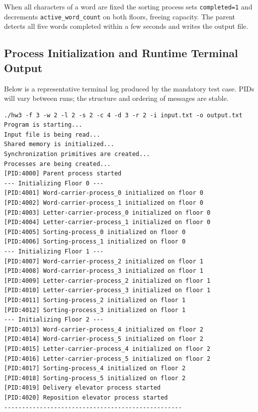 \documentclass[12pt,a4paper]{article}
\newcommand{\code}[1]{\texttt{\small #1}}
\begin{document}
When all characters of a word are fixed the sorting process sets
\code{completed=1} and decrements \code{active\_word\_count} on both floors,
freeing capacity. The parent detects all five words completed within a few seconds
and writes the output file.

\subsection{Process Initialization and Runtime Terminal Output}

Below is a representative terminal log produced by the mandatory test case.
PIDs will vary between runs; the structure and ordering of messages are stable.

\begin{lstlisting}[language={},numbers=none,caption={Program startup and process initialization (mandatory test case).}]
./hw3 -f 3 -w 2 -l 2 -s 2 -c 4 -d 3 -r 2 -i input.txt -o output.txt
Program is starting...
Input file is being read...
Shared memory is initialized...
Synchronization primitives are created...
Processes are being created...
[PID:4000] Parent process started
--- Initializing Floor 0 ---
[PID:4001] Word-carrier-process_0 initialized on floor 0
[PID:4002] Word-carrier-process_1 initialized on floor 0
[PID:4003] Letter-carrier-process_0 initialized on floor 0
[PID:4004] Letter-carrier-process_1 initialized on floor 0
[PID:4005] Sorting-process_0 initialized on floor 0
[PID:4006] Sorting-process_1 initialized on floor 0
--- Initializing Floor 1 ---
[PID:4007] Word-carrier-process_2 initialized on floor 1
[PID:4008] Word-carrier-process_3 initialized on floor 1
[PID:4009] Letter-carrier-process_2 initialized on floor 1
[PID:4010] Letter-carrier-process_3 initialized on floor 1
[PID:4011] Sorting-process_2 initialized on floor 1
[PID:4012] Sorting-process_3 initialized on floor 1
--- Initializing Floor 2 ---
[PID:4013] Word-carrier-process_4 initialized on floor 2
[PID:4014] Word-carrier-process_5 initialized on floor 2
[PID:4015] Letter-carrier-process_4 initialized on floor 2
[PID:4016] Letter-carrier-process_5 initialized on floor 2
[PID:4017] Sorting-process_4 initialized on floor 2
[PID:4018] Sorting-process_5 initialized on floor 2
[PID:4019] Delivery elevator process started
[PID:4020] Reposition elevator process started
--------------------------------------------------
\end{lstlisting}
\end{document}
